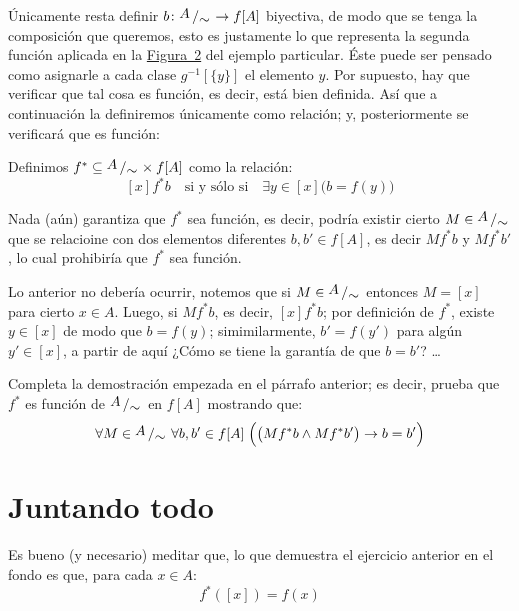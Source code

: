 \documentclass[letterpaper,DIV=14,headsepline,12pt]{scrartcl}
\newcommand{\pts}{}
\newenvironment{ejercicio}[1]{\ifthenelse{\equal{#1}{1} \OR
\equal{#1}{+1}}{\renewcommand{\pts}{\textbf{(#1
pt)}}}{\renewcommand{\pts}{\textbf{(#1 pts)}}}\begin{ejj}\upshape
\pts}{\end{ejj}}
\newcommand{\quot}[2]{{\raisebox{.2em}{$#1$}\left/\raisebox{-.2em}{$#2$}\right.}}
\begin{document}
    Únicamente resta definir $b\colon \quot{A}{\sim} \to f[A]$ biyectiva, de modo que
    se tenga la composición que queremos, esto es justamente lo que representa
    la segunda función aplicada en la \hyperref[fig:g]{Figura~2} del ejemplo
    particular. Éste puede ser pensado como asignarle a cada clase
    $g^{-1}[\{y\}]$ el elemento $y$. Por supuesto, hay que verificar que tal
    cosa es función, es decir, está bien definida. Así que a continuación la
    definiremos únicamente como relación; y, posteriormente se verificará que es
    función:
    \begin{definicion}
        Definimos $f^* \subseteq \quot{A}{\sim} \times f[A]$ como la relación:
        \[  [x] f^* b \quad \text{si y sólo si} \quad \exists y \in [x] \big( b=f(y)
        \big) \]
    \end{definicion}

    Nada (aún) garantiza que $f^*$ sea función, es decir, podría existir cierto
    $M \in \quot{A}{\sim}$ que se relacioine con dos elementos diferentes $b,b'
    \in f[A]$, es decir $M f^* b$ y $M f^* b'$, lo cual prohibiría que $f^*$ sea
    función.
    
    Lo anterior no debería ocurrir, notemos que si $M \in \quot{A}{\sim}$
    entonces $M=[x]$ para cierto $x \in A$. Luego, si $M f^* b$, es decir, $[x]
    f^* b$; por definición de $f^*$, existe $y \in [x]$ de modo que $b=f(y)$;
    simimilarmente, $b'=f(y')$ para algún $y'\in[x]$, a partir de aquí ¿Cómo se
    tiene la garantía de que $b=b'$? \dots

    \begin{ejercicio}{1.5}\label{ej:fStar} Completa la demostración empezada en
        el párrafo anterior; es decir, prueba que $f^*$ es función de
        $\quot{A}{\sim}$ en $f[A]$ mostrando que:
        \[ \forall M \in \quot{A}{\sim} \; \forall b,b' \in f[A] \; \Big( \big(
        M f^* b \land M f^* b' \big) \to b=b' \Big) \]
    \end{ejercicio}

    \section*{Juntando todo}

    Es bueno (y necesario) meditar que, lo que demuestra el ejercicio anterior
    en el fondo es que, para cada $x \in A$:
    \begin{equation}\label{eq:fStar}
        f^*([x])=f(x)
    \end{equation}
\end{document}
